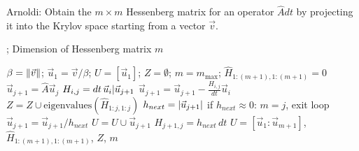 \begin{algorithm}
  \caption{{\sc Arnoldi:}
  Obtain the $m \times m$ Hessenberg matrix for an operator $\hat{A} dt$ by
  projecting it into the Krylov space starting from a vector $\vec{v}$.
  \label{al:Arnoldi}
  }
  \begin{algorithmic}[1]

    \Statex

    ;
    Dimension of Hessenberg matrix $m$
    \Statex

      \State $\beta = \lVert\vec{v}\rVert$; $\vec{u}_1 = \vec{v} / \beta$;
              $U = [ \vec{u}_{1} ]$; $Z = \emptyset $; $m = m_{\max}$;
              $\hat{H}_{1:(m+1),1:(m+1)} = 0$
        \State $\vec{u}_{j+1} = \hat{A} \vec{u}_j$
          \State $H_{i,j} = dt \, \Braket{\vec{u}_i | \vec{u}_{j+1}}$
          \State $\vec{u}_{j+1} = \vec{u}_{j+1} - \frac{H_{i,j}}{dt} \vec{u}_i$
        \EndFor
        \State $Z = Z \cup \text{eigenvalues}(\hat{H}_{1:j,1:j})$
        \State $h_{next} = \left|\vec{u}_{j+1}\right|$
        \State if $h_{next} \approx 0$: $m = j$, exit loop
        \State $\vec{u}_{j+1} = \vec{u}_{j+1} / h_{next}$
        \State $U = U \cup \vec{u}_{j+1}$
        \State $H_{j+1,j} = h_{next} \, dt$
      \EndFor
      \State \Return $U = [ \vec{u}_{1} : \vec{u}_{m+1}]$,
                     $\hat{H}_{1:(m+1), 1:(m+1)}$, $Z$, $m$
    \EndProcedure
  \end{algorithmic}
\end{algorithm}


